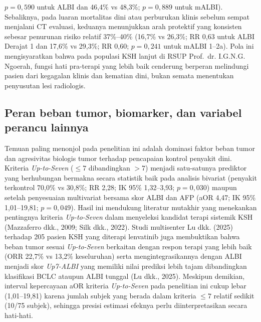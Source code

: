 \documentclass[
  indonesian,
]{report}
\begin{document}
\begin{enumerate}
  \(p = 0,590\) untuk ALBI dan 46,4\% vs 48,3\%; \(p = 0,889\) untuk
  mALBI). Sebaliknya, pada luaran mortalitas dini atau perburukan klinis
  sebelum sempat menjalani CT evaluasi, keduanya menunjukkan arah
  protektif yang konsisten sebesar penurunan risiko relatif 37\%--40\%
  (16,7\% vs 26,3\%; RR 0,63 untuk ALBI Derajat 1 dan 17,6\% vs 29,3\%;
  RR 0,60; \(p = 0,241\) untuk mALBI 1--2a). Pola ini mengisyaratkan
  bahwa pada populasi KSH lanjut di RSUP Prof.~dr. I.G.N.G. Ngoerah,
  fungsi hati pra-terapi yang lebih baik cenderung berperan melindungi
  pasien dari kegagalan klinis dan kematian dini, bukan semata
  menentukan penyusutan lesi radiologis.
\end{enumerate}

\subsection{Peran beban tumor, biomarker, dan variabel perancu
lainnya}\label{peran-beban-tumor-biomarker-dan-variabel-perancu-lainnya}

Temuan paling menonjol pada penelitian ini adalah dominasi faktor beban
tumor dan agresivitas biologis tumor terhadap pencapaian kontrol
penyakit dini. Kriteria \emph{Up-to-Seven} (\(\le 7\) dibandingkan
\(> 7\)) menjadi satu-satunya prediktor yang berhubungan bermakna secara
statistik baik pada analisis bivariat (penyakit terkontrol 70,0\% vs
30,8\%; RR 2,28; IK 95\% 1,32--3,93; \(p = 0,030\)) maupun setelah
penyesuaian multivariat bersama skor ALBI dan AFP (aOR 4,47; IK 95\%
1,01--19,81; \(p = 0,049\)). Hasil ini mendukung literatur mutakhir yang
menekankan pentingnya kriteria \emph{Up-to-Seven} dalam menyeleksi
kandidat terapi sistemik KSH (Mazzaferro dkk., 2009; Silk dkk., 2022).
Studi multisenter Lu dkk. (2025) terhadap 205 pasien KSH yang diterapi
lenvatinib juga membuktikan bahwa beban tumor sesuai \emph{Up-to-Seven}
berkaitan dengan respon terapi yang lebih baik (ORR 22,7\% vs 13,2\%
keseluruhan) serta mengintegrasikannya dengan ALBI menjadi skor
\emph{Up7-ALBI} yang memiliki nilai prediksi lebih tajam dibandingkan
klasifikasi BCLC ataupun ALBI tunggal (Lu dkk., 2025). Meskipun
demikian, interval kepercayaan aOR kriteria \emph{Up-to-Seven} pada
penelitian ini cukup lebar (1,01--19,81) karena jumlah subjek yang
berada dalam kriteria \(\le 7\) relatif sedikit (10/75 subjek), sehingga
presisi estimasi efeknya perlu diinterpretasikan secara hati-hati.
\end{document}

